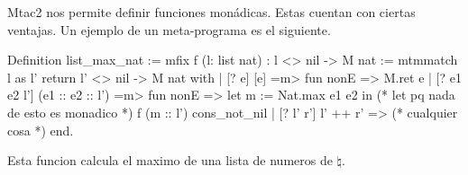 Mtac2 nos permite definir funciones monádicas. Estas cuentan con ciertas ventajas. Un ejemplo de un meta-programa es el siguiente.

\begin{coqe}
Definition list_max_nat :=
  mfix f (l: list nat) : l <> nil -> M nat :=
    mtmmatch l as l' return l' <> nil -> M nat with
    | [? e] [e] =m> fun nonE => M.ret e
    | [? e1 e2 l'] (e1 :: e2 :: l') =m> fun nonE =>
      let m := Nat.max e1 e2 in (* let pq nada de esto es monadico *)
      f (m :: l') cons_not_nil
    | [? l' r'] l' ++ r' => (* cualquier cosa *) 
    end.
\end{coqe}

Esta funcion calcula el maximo de una lista de numeros de $\natural$.
